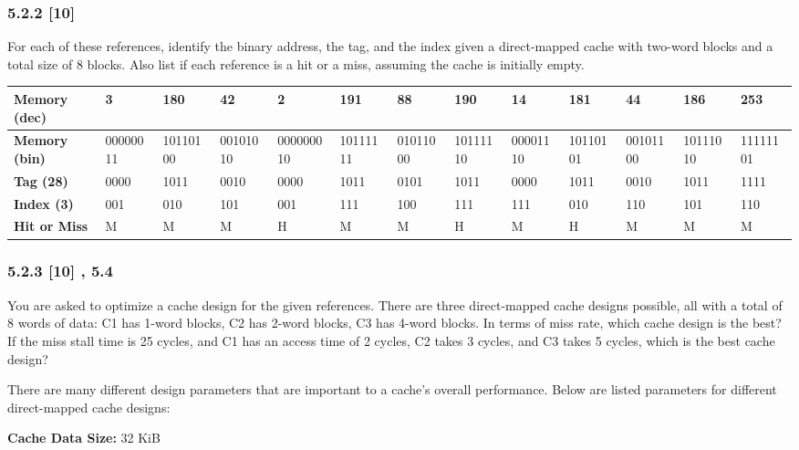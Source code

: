 \documentclass[fleqn]{article}
\begin{document}
\subsubsection*{5.2.2 [10] \textrangle} For each of these references, identify the binary address, the tag, and the index given a direct-mapped cache with two-word blocks and a total size of 8 blocks. Also list if each reference is a hit or a miss, assuming the cache is initially empty.
\begin{table}[H]
    \centering
    \setlength{\tabcolsep}{3pt}
    \fontsize{6pt}{12pt}\selectfont
    \begin{tabular}{l|l|l|l|l|l|l|l|l|l|l|l|l}
    \textbf{Memory (dec)} & \textbf{3} & \textbf{180} & \textbf{42} & \textbf{2} & \textbf{191} & \textbf{88} & \textbf{190} & \textbf{14} & \textbf{181} & \textbf{44} & \textbf{186} & \textbf{253} \\ \hline
    \textbf{Memory (bin)} & 00000011 & 10110100 & 00101010 & 000000010 & 10111111 & 01011000 & 10111110 & 00001110 & 10110101 & 00101100 & 10111010 & 11111101 \\
    \textbf{Tag (28)} & 0000 & 1011 & 0010 & 0000 & 1011 & 0101 & 1011 & 0000 & 1011 & 0010 & 1011 & 1111 \\
    \textbf{Index (3)} & 001 & 010 & 101 & 001 & 111 & 100 & 111 & 111 & 010 & 110 & 101 & 110 \\
    \textbf{Hit or Miss} & M & M & M & H & M & M & H & M & H & M & M & M
    \end{tabular}
\end{table}

\subsubsection*{5.2.3 [10] , 5.4\textrangle} You are asked to optimize a cache design for the given references. There are three direct-mapped cache designs possible, all with a total of 8 words of data:
C1 has 1-word blocks,
C2 has 2-word blocks,
C3 has 4-word blocks.
In terms of miss rate, which cache design is the best? If the miss stall time is 25 cycles, and C1 has an access time of 2 cycles, C2 takes 3 cycles, and C3 takes 5 cycles, which is the best cache design?

There are many different design parameters that are important to a cache's overall performance. Below are listed parameters for different direct-mapped cache designs:

\textbf{Cache Data Size:} 32 KiB
\end{document}
